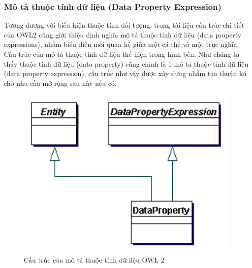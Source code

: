\subsubsection{Mô tả thuộc tính dữ liệu (Data Property Expression)}
Tương đương với biểu hiện thuộc tính đối tượng, trong tài liệu cấu trúc chi tiết của OWL2 cũng giới thiệu định nghĩa mô tả thuộc tính dữ liệu  (data property expressions), nhằm biểu diễn mối quan hệ giữa một cá thể và một trực nghĩa. Cấu trúc của mô tả thuộc tính dữ liệu thể hiện trong hình bên. Như chúng ta thấy thuộc tính dữ liệu (data property) cũng chính là 1 mô tả thuộc tính dữ liệu (data property expression), cấu trúc như vậy được xây dựng nhằm tạo thuận lợi cho nhu cầu mở rộng sau này nếu có.
\begin{figure}[h!]
	\centering
	\includegraphics[width=110mm]{Figures/data_property_expression.png}
	\caption{Cấu trúc của mô tả thuộc tính dữ liệu OWL 2\label{overflow}}
\end{figure}

